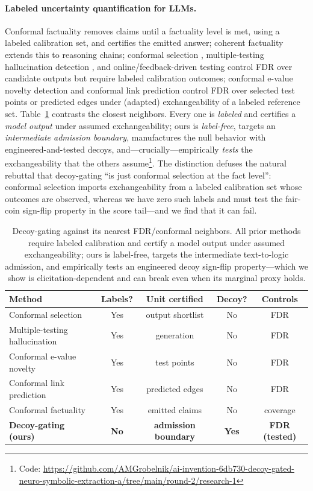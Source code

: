 \documentclass[11pt,letterpaper]{article}
\begin{document}
\paragraph{Labeled uncertainty quantification for LLMs.} Conformal factuality \cite{Mohri2024} removes claims until a factuality level is met, using a labeled calibration set, and certifies the emitted answer; coherent factuality \cite{RubinToles2025} extends this to reasoning chains; conformal selection \cite{Jin2022}, multiple-testing hallucination detection \cite{Li2025}, and online/feedback-driven testing \cite{Lu2025} control FDR over candidate outputs but require labeled calibration outcomes; conformal e-value novelty detection \cite{Bashari2023} and conformal link prediction \cite{Marandon2023} control FDR over selected test points or predicted edges under (adapted) exchangeability of a labeled reference set. Table~\ref{tab:novelty} contrasts the closest neighbors. Every one is \emph{labeled} and certifies a \emph{model output} under assumed exchangeability; ours is \emph{label-free}, targets an \emph{intermediate admission boundary}, manufactures the null behavior with engineered-and-tested decoys, and---crucially---empirically \emph{tests} the exchangeability that the others assume\footnote{Code: \url{https://github.com/AMGrobelnik/ai-invention-6db730-decoy-gated-neuro-symbolic-extraction-a/tree/main/round-2/research-1}}. The distinction defuses the natural rebuttal that decoy-gating ``is just conformal selection at the fact level'': conformal selection imports exchangeability from a labeled calibration set whose outcomes are observed, whereas we have zero such labels and must test the fair-coin sign-flip property in the score tail---and we find that it can fail.

\begin{table}[t]
\centering
\small
\begin{tabular}{lcccc}
\toprule
Method & Labels? & Unit certified & Decoy? & Controls \\
\midrule
Conformal selection \cite{Jin2022} & Yes & output shortlist & No & FDR \\
Multiple-testing hallucination \cite{Li2025} & Yes & generation & No & FDR \\
Conformal e-value novelty \cite{Bashari2023} & Yes & test points & No & FDR \\
Conformal link prediction \cite{Marandon2023} & Yes & predicted edges & No & FDR \\
Conformal factuality \cite{Mohri2024} & Yes & emitted claims & No & coverage \\
\textbf{Decoy-gating (ours)} & \textbf{No} & \textbf{admission boundary} & \textbf{Yes} & \textbf{FDR (tested)} \\
\bottomrule
\end{tabular}
\caption{Decoy-gating against its nearest FDR/conformal neighbors. All prior methods require labeled calibration and certify a model output under assumed exchangeability; ours is label-free, targets the intermediate text-to-logic admission, and empirically tests an engineered decoy sign-flip property---which we show is elicitation-dependent and can break even when its marginal proxy holds.}
\label{tab:novelty}
\end{table}
\end{document}
